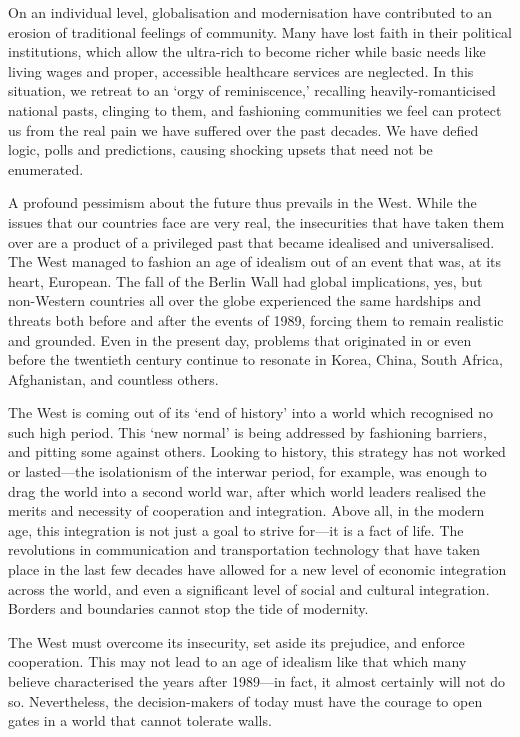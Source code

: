    On an individual level, globalisation and modernisation have
   contributed to an erosion of traditional feelings of community. Many
   have lost faith in their political institutions, which allow the
   ultra-rich to become richer while basic needs like living wages and
   proper, accessible healthcare services are neglected. In this
   situation, we retreat to an `orgy of reminiscence,' recalling 
   heavily-romanticised national pasts, clinging to them, and fashioning
   communities we feel can protect us from the real pain we have suffered
   over the past decades. We have defied logic, polls and predictions, 
   causing shocking upsets that need not be enumerated.
   
   A profound pessimism about the future thus prevails in the West. While
   the issues that our countries face are very real, the insecurities that
   have taken them over are a product of a privileged past that became
   idealised and universalised. The West managed to fashion an age of
   idealism out of an event that was, at its heart, European. The fall of
   the Berlin Wall had global implications, yes, but non-Western countries
   all over the globe experienced the same hardships and threats both
   before and after the events of 1989, forcing them to remain realistic
   and grounded. Even in the present day, problems that originated in or
   even before the twentieth century continue to resonate in Korea, China,
   South Africa, Afghanistan, and countless others.

   The West is coming out of its `end of history' into a world which
   recognised no such high period. This `new normal' is being addressed by
   fashioning barriers, and pitting some against others. Looking to
   history, this strategy has not worked or lasted---the isolationism of
   the interwar period, for example, was enough to drag the world into a
   second world war, after which world leaders realised the merits and
   necessity of cooperation and integration. Above all, in the modern age,
   this integration is not just a goal to strive for---it is a fact of
   life. The revolutions in communication and transportation technology
   that have taken place in the last few decades have allowed for a new
   level of economic integration across the world, and even a significant
   level of social and cultural integration. Borders and boundaries cannot
   stop the tide of modernity. 
   
   The West must overcome its insecurity, set
   aside its prejudice, and enforce cooperation. This may not lead to an
   age of idealism like that which many believe characterised the years
   after 1989---in fact, it almost certainly will not do so. Nevertheless,
   the decision-makers of today must have the courage to open gates in a
   world that cannot tolerate walls.